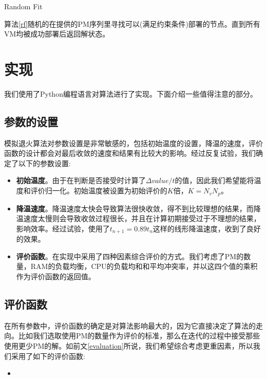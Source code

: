 \begin{algorithm}[H]
  \DontPrintSemicolon
  
  \caption{Random Fit\label{rf}}
\end{algorithm}

算法\ref{rf}随机的在提供的PM序列里寻找可以(满足约束条件)部署的节点。直到所有VM均被成功部署后返回解状态。

\section{实现}
\label{sec:implementation}

我们使用了Python编程语言对算法进行了实现。下面介绍一些值得注意的部分。

\subsection{参数的设置}
\label{sec:config}

模拟退火算法对参数设置是非常敏感的，包括初始温度的设置，降温的速度，评价函数的设计都会对最后收敛的速度和结果有比较大的影响。经过反复试验，我们确定了以下的参数设置:

\begin{itemize}
\item \textbf{初始温度}。由于在判断是否接受时计算了$\Delta value/t$的值，因此我们希望能将温度和评价归一化。初始温度被设置为初始评价的$K$倍，$K = N_v N_p$。
\item \textbf{降温速度}。降温速度太快会导致算法很快收敛，得不到比较理想的结果，而降温速度太慢则会导致收敛过程很长，并且在计算初期接受过于不理想的结果，影响效率。经过试验，使用了$t_{n+1} = 0.89t_n$这样的线形降温速度，收到了良好的效果。
\item \textbf{评价函数}。在实现中采用了四种因素综合评价的方式。我们考虑了PM的数量，RAM的负载均衡，CPU的负载均和和平均冲突率，并以这四个值的乘积作为评价函数的返回值。\label{evalutation}
\end{itemize}

\subsection{评价函数}
\label{sec:evaluation-function}

在所有参数中，评价函数的确定是对算法影响最大的，因为它直接决定了算法的走向。比如我们选取使用PM的数量作为评价的标准，那么在迭代的过程中接受那些使用更少PM的解。如前文\ref{evaluation}所说，我们希望综合考虑更重因素，所以我们采用了如下的评价函数:

\begin{itemize}
\item 
\end{itemize}
